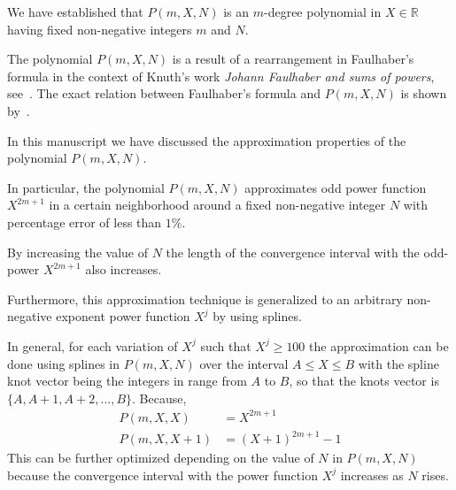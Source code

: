 We have established that $P(m, X, N)$ is an $m$-degree polynomial in $X\in\mathbb{R}$
having fixed non-negative integers $m$ and $N$.

The polynomial $P(m, X, N)$ is a result of a rearrangement in Faulhaber's formula
in the context of Knuth's work \textit{Johann Faulhaber and sums of powers}, see~\cite{knuth1993johann}.
The exact relation between Faulhaber's formula and $P(m,X,N)$ is shown by~\cite{kolosov2025unexpected}.

In this manuscript we have discussed the approximation properties of the polynomial $P(m,X,N)$.

In particular, the polynomial $P(m,X,N)$ approximates odd power function $X^{2m+1}$ in a certain neighborhood
around a fixed non-negative integer $N$ with percentage error of less than $1\%$.

By increasing the value of $N$ the length of the convergence interval with the odd-power $X^{2m+1}$ also increases.

Furthermore, this approximation technique is generalized to an arbitrary non-negative exponent power function $X^j$
by using splines.

In general, for each variation of $X^j$ such that $X^j \geq 100$ the approximation can be done using
splines in $P(m,X, N)$ over the interval $A \leq X \leq B$ with the spline knot vector being the integers in
range from $A$ to $B$, so that the knots vector is $\{A, A+1, A+2, \ldots, B \}$.
Because,
\begin{align*}
    P(m,X, X) &= X^{2m+1} \\
    P(m,X, X+1) &= (X+1)^{2m+1} - 1
\end{align*}
This can be further optimized depending on the value of $N$ in $P(m,X,N)$ because the convergence interval
with the power function $X^j$ increases as $N$ rises.
